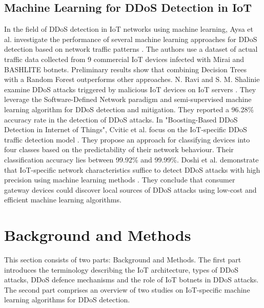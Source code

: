 \documentclass[conference, 11pt]{IEEEtran}
\begin{document}
    \subsection{Machine Learning for DDoS Detection in IoT}
    In the field of DDoS detection in IoT networks using machine learning, Aysa et al. investigate the performance of several machine learning approaches for DDoS detection based on network traffic patterns \cite{article:11}.
    The authors use a dataset of actual traffic data collected from 9 commercial IoT devices infected with Mirai and BASHLITE botnets.
    Preliminary results show that combining Decision Trees with a Random Forest outperforms other approaches.
    N. Ravi and S. M. Shalinie examine DDoS attacks triggered by malicious IoT devices on IoT servers \cite{ravi2020learning}.
    They leverage the Software-Defined Network paradigm and semi-supervised machine learning algorithm for DDoS detection and mitigation.
    They reported a 96.28\% accuracy rate in the detection of DDoS attacks.
    In "Boosting-Based DDoS Detection in Internet of Things", Cvitic et al. focus on the IoT-specific DDoS traffic detection model \cite{article:10}.
    They propose an approach for classifying devices into four classes based on the predictability of their network behaviour.
    Their classification accuracy lies between 99.92\% and 99.99\%.
    Doshi et al. demonstrate that IoT-specific network characteristics suffice to detect DDoS attacks with high precision using machine learning methods \cite{inproceedings:1}.
    They conclude that consumer gateway devices could discover local sources of DDoS attacks using low-cost and efficient machine learning algorithms.


    \section{Background and Methods}
    This section consists of two parts: Background and Methods.
    The first part introduces the terminology describing the IoT architecture, types of DDoS attacks, DDoS defence mechanisms and the role of IoT botnets in DDoS attacks.
    The second part comprises an overview of two studies on IoT-specific machine learning algorithms for DDoS detection.
\end{document}
